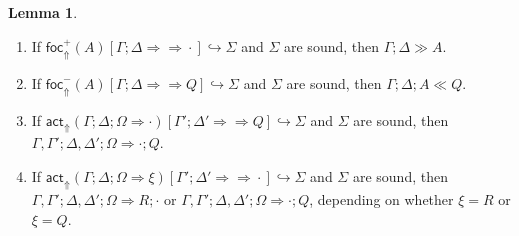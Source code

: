 \documentclass{article}
\theoremstyle{definition}
\newtheorem{lemma}{Lemma}
\newcommand{\bneuseqsymb}{
  \mathrel{\Longrightarrow\!\!\!\!\!\!\!\!\Longrightarrow}}
\newcommand{\bneuseq}[3]{#1 ; #2 \bneuseqsymb #3}
\newcommand{\brfrel}[1]{\textsf{foc}^+_{\Uparrow}(#1)}
\newcommand{\blfrel}[1]{\textsf{foc}^-_{\Uparrow}(#1)}
\newcommand{\bactrel}[1]{\textsf{act}_{\Uparrow}(#1)}
\newcommand{\relj}[3]{#1 [#2] \hookrightarrow #3}
\newcommand{\brfrelj}[3]{\relj{\brfrel{#1}}{#2}{#3}}
\newcommand{\blfrelj}[3]{\relj{\blfrel{#1}}{#2}{#3}}
\newcommand{\bactrelj}[3]{\relj{\bactrel{#1}}{#2}{#3}}
\newcommand{\btriseq}[4]{#1; #2; #3 \Longrightarrow #4}
\newcommand{\rfocseq}[3]{#1; #2 \gg #3}
\newcommand{\lfocseq}[4]{#1; #2; #3 \ll #4}
\begin{document}
\begin{lemma}\label{bkwdder-soundness-lemma}
  \begin{enumerate}
  \item If $\brfrelj{A}{\bneuseq{\Gamma}{\Delta}{\cdot}}{\Sigma}$ and $\Sigma$
    are sound, then $\rfocseq{\Gamma}{\Delta}{A}$.
  \item If $\blfrelj{A}{\bneuseq{\Gamma}{\Delta}{Q}}{\Sigma}$ and $\Sigma$
    are sound, then $\lfocseq{\Gamma}{\Delta}{A}{Q}$.
  \item If
    $\bactrelj{\btriseq{\Gamma}{\Delta}{\Omega}{\cdot}}{\bneuseq{\Gamma'}{\Delta'}{Q}}{\Sigma}$
    and $\Sigma$ are sound, then $\btriseq{\Gamma, \Gamma'}{\Delta,
      \Delta'}{\Omega}{\cdot ; Q}$.
  \item If
    $\bactrelj{\btriseq{\Gamma}{\Delta}{\Omega}{\xi}}{\bneuseq{\Gamma'}{\Delta'}{\cdot}}{\Sigma}$
    and $\Sigma$ are sound, then
    $\btriseq{\Gamma, \Gamma'}{\Delta, \Delta'}{\Omega}{R ; \cdot}$ or
    $\btriseq{\Gamma, \Gamma'}{\Delta, \Delta'}{\Omega}{\cdot ; Q}$, depending
    on whether $\xi = R$ or $\xi = Q$.
  \end{enumerate}
\end{lemma}
\end{document}
